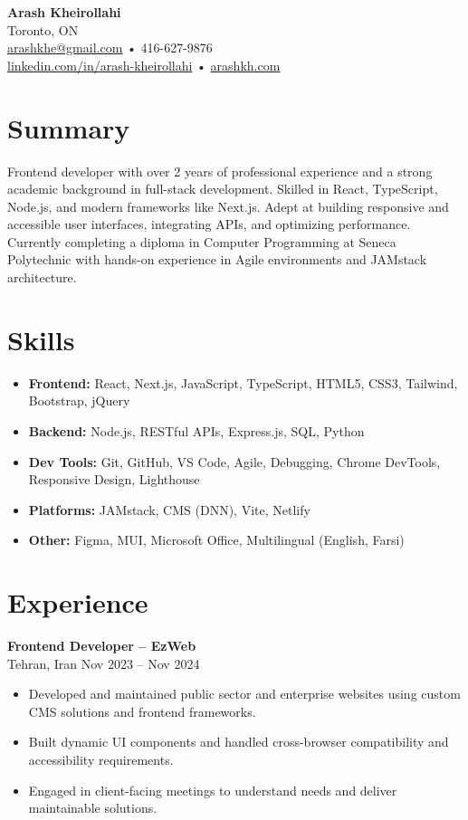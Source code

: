 \documentclass[letterpaper,11pt]{article}
\begin{document}

{\LARGE \textbf{Arash Kheirollahi}}\\[0.2em]
Toronto, ON \\ 
\href{mailto:arashkhe@gmail.com}{arashkhe@gmail.com} • 416-627-9876 \\ 
\href{https://linkedin.com/in/arash-kheirollahi}{linkedin.com/in/arash-kheirollahi} • \href{https://arashkh.com}{arashkh.com}\\

\vspace{0.8em}

\section*{Summary}
Frontend developer with over 2 years of professional experience and a strong academic background in full-stack development. Skilled in React, TypeScript, Node.js, and modern frameworks like Next.js. Adept at building responsive and accessible user interfaces, integrating APIs, and optimizing performance. Currently completing a diploma in Computer Programming at Seneca Polytechnic with hands-on experience in Agile environments and JAMstack architecture.

\section*{Skills}
\begin{itemize}[leftmargin=*]
  \item \textbf{Frontend:} React, Next.js, JavaScript, TypeScript, HTML5, CSS3, Tailwind, Bootstrap, jQuery
  \item \textbf{Backend:} Node.js, RESTful APIs, Express.js, SQL, Python
  \item \textbf{Dev Tools:} Git, GitHub, VS Code, Agile, Debugging, Chrome DevTools, Responsive Design, Lighthouse
  \item \textbf{Platforms:} JAMstack, CMS (DNN), Vite, Netlify
  \item \textbf{Other:} Figma, MUI, Microsoft Office, Multilingual (English, Farsi)
\end{itemize}

\section*{Experience}

\textbf{Frontend Developer – EzWeb}\\
Tehran, Iran \hfill Nov 2023 -- Nov 2024
\begin{itemize}[leftmargin=*]
  \item Developed and maintained public sector and enterprise websites using custom CMS solutions and frontend frameworks.
  \item Built dynamic UI components and handled cross-browser compatibility and accessibility requirements.
  \item Engaged in client-facing meetings to understand needs and deliver maintainable solutions.
\end{itemize}
\end{document}
